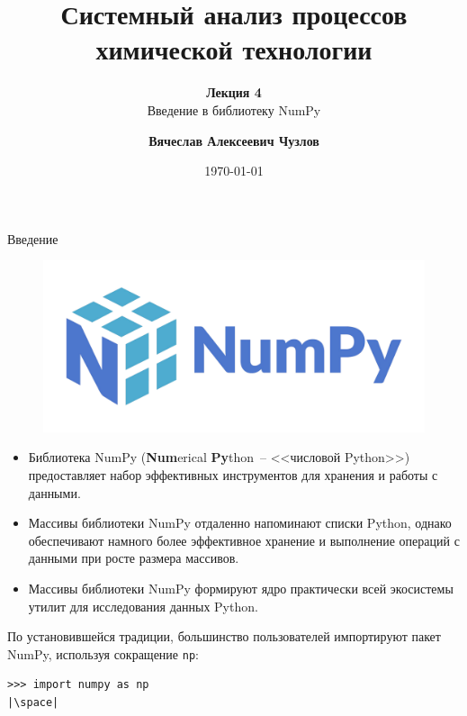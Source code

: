 \documentclass[aspectratio=169, mathserif]{beamer}	%
\title{\LARGE{Системный анализ процессов химической технологии}}
\subtitle{\textbf{Лекция 4} \\ Введение в библиотеку NumPy}
\author[]{\textbf{Вячеслав Алексеевич Чузлов}}
\institute{к.т.н., доцент ОХИ ИШПР}
\date{\today}
\begin{document}

\titleframe		%

\tocframe{}		%


\begin{frame}[fragile]{Введение}
\scriptsize
\begin{figure}
	\begin{center}
		\includegraphics[width=\linewidth]{./pics/NumPy_logo}
	\end{center}
\end{figure}
\begin{itemize}
	\item Библиотека NumPy (\textbf{Num}erical \textbf{Py}thon~-- <<числовой Python>>) предоставляет набор эффективных инструментов для хранения и работы с данными.
	\item Массивы библиотеки NumPy отдаленно напоминают списки Python, однако обеспечивают намного более эффективное хранение и выполнение операций с данными при росте размера массивов.
	\item Массивы библиотеки NumPy формируют ядро практически всей экосистемы утилит для исследования данных Python.
\end{itemize}

По установившейся традиции, большинство пользователей импортируют пакет NumPy, используя сокращение \texttt{np}:

\begin{verbatim}
>>> import numpy as np
|\space|
\end{verbatim}
\vfil
\end{frame}
\end{document}
